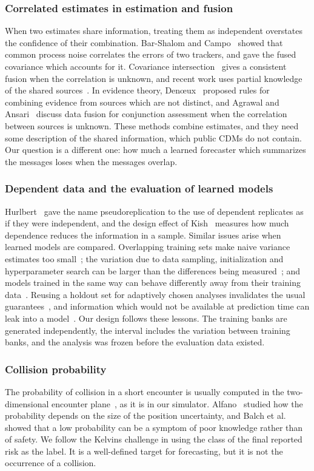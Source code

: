 \documentclass[conference]{IEEEtran}
\begin{document}
\subsubsection*{Correlated estimates in estimation and fusion}
When two estimates share information, treating them as independent overstates the confidence of their combination. Bar-Shalom and Campo~\cite{barshalom1986} showed that common process noise correlates the errors of two trackers, and gave the fused covariance which accounts for it. Covariance intersection~\cite{julier1997} gives a consistent fusion when the correlation is unknown, and recent work uses partial knowledge of the shared sources~\cite{pedroso2026}. In evidence theory, Den\oe ux~\cite{denoeux2008,denoeux2024} proposed rules for combining evidence from sources which are not distinct, and Agrawal and Ansari~\cite{agrawal2025} discuss data fusion for conjunction assessment when the correlation between sources is unknown. These methods combine estimates, and they need some description of the shared information, which public CDMs do not contain. Our question is a different one: how much a learned forecaster which summarizes the messages loses when the messages overlap.

\subsubsection*{Dependent data and the evaluation of learned models}
Hurlbert~\cite{hurlbert1984} gave the name pseudoreplication to the use of dependent replicates as if they were independent, and the design effect of Kish~\cite{kish1965} measures how much dependence reduces the information in a sample. Similar issues arise when learned models are compared. Overlapping training sets make naive variance estimates too small~\cite{dietterich1998,nadeau2003}; the variation due to data sampling, initialization and hyperparameter search can be larger than the differences being measured~\cite{bouthillier2021}; and models trained in the same way can behave differently away from their training data~\cite{damour2022}. Reusing a holdout set for adaptively chosen analyses invalidates the usual guarantees~\cite{dwork2015}, and information which would not be available at prediction time can leak into a model~\cite{kaufman2012}. Our design follows these lessons. The training banks are generated independently, the interval includes the variation between training banks, and the analysis was frozen before the evaluation data existed.

\subsubsection*{Collision probability}
The probability of collision in a short encounter is usually computed in the two-dimensional encounter plane~\cite{akella2000}, as it is in our simulator. Alfano~\cite{alfano2005} studied how the probability depends on the size of the position uncertainty, and Balch et al.~\cite{balch2019} showed that a low probability can be a symptom of poor knowledge rather than of safety. We follow the Kelvins challenge in using the class of the final reported risk as the label. It is a well-defined target for forecasting, but it is not the occurrence of a collision.
\end{document}

